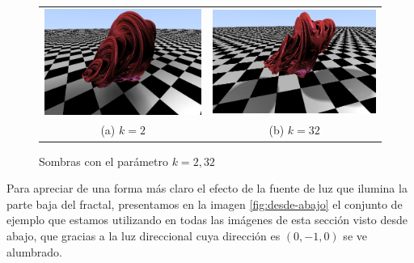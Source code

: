 \begin{figure}[ht]
    \centering
    \begin{tabular}{cc}
        \includegraphics[scale=0.4]{img/C8/sombras-k-2.png} &
      \includegraphics[scale=0.42]{img/C8/sombras-k-32.png} \\    
    (a) $k=2$ & (b) $k=32$  \\
    \end{tabular}
    \caption{Sombras con el parámetro $k=2,32$}
    \label{fig:sombras-k}
\end{figure}

Para apreciar de una forma más claro el efecto de la fuente de luz que ilumina la parte baja del fractal, presentamos en la imagen \ref{fig:desde-abajo} el conjunto de ejemplo que estamos utilizando en todas las imágenes de esta sección visto desde abajo, que gracias a la luz direccional cuya dirección es $(0,-1,0)$ se ve alumbrado.

